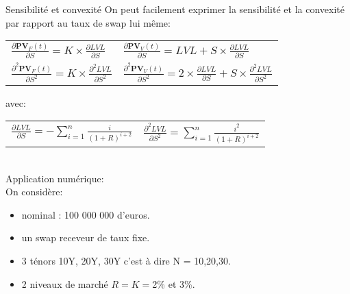 \documentclass{beamer}
\begin{document}
\begin{frame}{Sensibilité et convexité}
On peut facilement exprimer la sensibilité et la convexité par rapport au taux de swap lui même:\\
\begin{center}
\begin{tabular}{ l l}
$\frac{\partial \textbf{PV}_F(t)}{\partial S}=K \times \frac{\partial LVL}{\partial S} $&
$\frac{\partial \textbf{PV}_V(t)}{\partial S}=LVL+S \times \frac{\partial LVL}{\partial S} $\\
$\frac{\partial^2 \textbf{PV}_F(t)}{\partial S^2}=K \times \frac{\partial^2 LVL}{\partial S^2} $&
$\frac{\partial^2 \textbf{PV}_V(t)}{\partial S^2}=2 \times \frac{\partial LVL}{\partial S} + S \times \frac{\partial^2 LVL}{\partial S^2}$\\
\end{tabular}
\end{center}
avec:\\
\vspace{0.5cm}
\begin{tabular}{c c}
$\frac{\partial LVL}{\partial S}=-\sum_{i=1}^{n} \frac{i}{(1+R)^{i+2}}$&
$\frac{\partial^2 LVL}{\partial S^2}=\sum_{i=1}^{n} \frac{i^2}{(1+R)^{i+2}}$
\end{tabular}\\
\vspace{0.5cm}
Application numérique:\\
On considère:
\begin{itemize}
\item nominal : 100 000 000 d'euros.\\
\item un swap receveur de taux fixe.
\item 3 ténors 10Y, 20Y, 30Y c'est à dire N = 10,20,30.
\item 2 niveaux de marché $R=K=$2\% et 3\%.
\end{itemize}
\end{frame}
\end{document}
